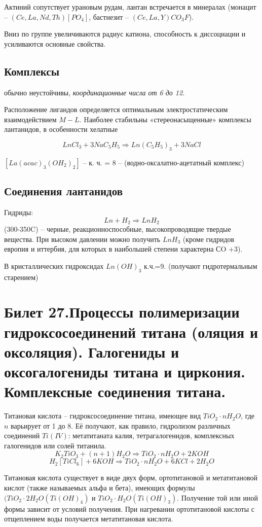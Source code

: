 \documentclass[11pt]{article}
\begin{document}
Актиний сопутствует урановым рудам, лантан встречается в минералах
(монацит – $(Ce, La, Nd, Th)[PO _4 ]$, бастнезит – $(Ce, La, Y)CO _3 F$).

Вниз по группе увеличиваются радиус катиона, способность к диссоциации и
усиливаются основные свойства.

\subsection{Комплексы} обычно неустойчивы, \emph{координационные числа от 6 до 12}.

Расположение лигандов определяется оптимальным электростатическим
взаимодействием $M-L$. Hаиболее стабильны «стереонасыщенные» комплексы
лантанидов, в особенности хелатные

$$LnCl _3 + 3NaC _5 H _5 \Rightarrow Ln(C _5 H _5 ) _3 + 3NaCl$$

$[La(acac) _3 (OH _2 ) _2 ]$ – к. ч. = 8 – (водно-оксалатно-ацетатный комплекс)

\subsection{Соединения лантанидов}

Гидриды:
$$Ln + H _2 \Rightarrow LnH _2$$ (300-350C) – черные, реакционноспособные, высокопроводящие
твердые вещества. При высоком давлении можно получить $LnH _3$ (кроме
гидридов европия и иттербия, для которых в наибольшей степени характерна
СO +3).

В кристаллических гидроксидах $Ln(OH) _3$ к.ч.=9. (получают гидротермальным
старением)


\section{ Билет 27.Процессы полимеризации гидроксосоединений титана
(оляция и оксоляция). Галогениды и оксогалогениды титана и
циркония. Комплексные соединения титана.}

Титановая кислота – гидроксосоединение титана, имеющее вид $TiO _2 \cdot nH _2 O$, где $n$
варьирует от 1 до 8. Её получают, как правило, гидролизом различных соединений $Ti (IV)$:
метатитаната калия, тетрагалогенидов, комплексных галогенидов или солей титанила.
$$K _2 TiO _3 + (n + 1)H _2 O \Rightarrow TiO _2 \cdot nH _2 O + 2KOH$$
$$H _2 [TiCl _6 ] + 6KOH \Rightarrow TiO _2 \cdot nH _2 O + 6KCl + 2H _2 O$$

Титановая кислота существует в виде двух форм, ортотитановой и метатитановой кислот
(также называемых альфа и бета), имеющих формулы $(TiO _2 \cdot 2H _2 O (Ti(OH) _4 )$ и $TiO _2 \cdot H _2 O (Ti(OH) _3 )$. Получение той или иной формы зависит от условий получения. При
нагревании ортотитановой кислоты с отщеплением воды получается метатитановая
кислота. 
\end{document}

